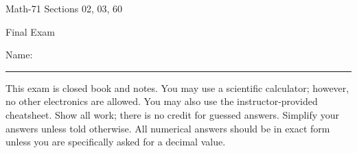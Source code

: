 \documentclass[letterpaper,12pt,fleqn]{article}
\begin{document}
\begin{center}
  \large
  Math-71 Sections 02, 03, 60

  \Large
  Final Exam
\end{center}

\vspace{0.5in}

Name: \rule{4in}{1pt}

\vspace{0.5in}

This exam is closed book and notes. You may use a scientific calculator; however, no other electronics are allowed.
You may also use the instructor-provided cheatsheet.  Show all work; there is no credit for guessed answers.
Simplify your answers unless told otherwise.  All numerical answers should be in exact form unless you are
specifically asked for a decimal value.

\vspace{0.5in}
\end{document}
